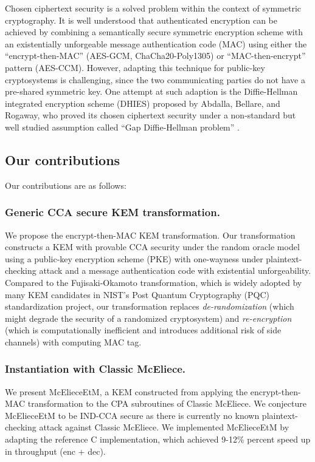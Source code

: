 \documentclass[runningheads]{llncs}
\begin{document}
Chosen ciphertext security is a solved problem within the context of symmetric cryptography. It is well understood that authenticated encryption can be achieved by combining a semantically secure symmetric encryption scheme with an existentially unforgeable message authentication code (MAC) using either the ``encrypt-then-MAC'' (AES-GCM, ChaCha20-Poly1305) or ``MAC-then-encrypt'' pattern (AES-CCM)\cite{DBLP:conf/asiacrypt/BellareN00,DBLP:conf/crypto/Krawczyk01}. However, adapting this technique for public-key cryptosystems is challenging, since the two communicating parties do not have a pre-shared symmetric key. One attempt at such adaption is the Diffie-Hellman integrated encryption scheme (DHIES) \cite{DBLP:journals/iacr/AbdallaBR99,DBLP:conf/ctrsa/AbdallaBR01} proposed by Abdalla, Bellare, and Rogaway, who proved its chosen ciphertext security under a non-standard but well studied assumption called ``Gap Diffie-Hellman problem'' \cite{DBLP:conf/pkc/OkamotoP01}.

\subsection{Our contributions}\label{sec:our-contributions}
Our contributions are as follows:

\subsubsection{Generic CCA secure KEM transformation.} We propose the encrypt-then-MAC KEM transformation. Our transformation constructs a KEM with provable CCA security under the random oracle model using a public-key encryption scheme (PKE) with one-wayness under plaintext-checking attack and a message authentication code with existential unforgeability. Compared to the Fujisaki-Okamoto transformation, which is widely adopted by many KEM candidates in NIST's Post Quantum Cryptography (PQC) standardization project, our transformation replaces \textit{de-randomization} (which might degrade the security of a randomized cryptosystem) and \textit{re-encryption} (which is computationally inefficient and introduces additional risk of side channels) with computing MAC tag.

\subsubsection{Instantiation with Classic McEliece.} We present McElieceEtM, a KEM constructed from applying the encrypt-then-MAC transformation to the CPA subroutines of Classic McEliece. We conjecture McElieceEtM to be IND-CCA secure as there is currently no known plaintext-checking attack against Classic McEliece. We implemented McElieceEtM by adapting the reference C implementation, which achieved 9-12\% percent speed up in throughput (enc + dec).
\end{document}
